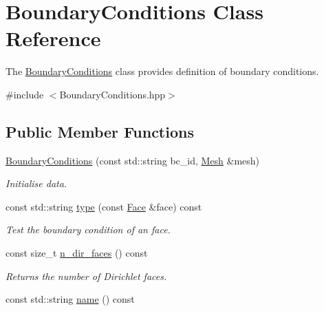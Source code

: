 \hypertarget{classBoundaryConditions}{}\section{Boundary\+Conditions Class Reference}
\label{classBoundaryConditions}


The \hyperlink{classBoundaryConditions}{Boundary\+Conditions} class provides definition of boundary conditions.  




{\ttfamily \#include $<$Boundary\+Conditions.\+hpp$>$}

\subsection*{Public Member Functions}
\begin{DoxyCompactItemize}
\item 
\hyperlink{classBoundaryConditions_a5f9b50ca35f0fcee51e84e015223396c}{Boundary\+Conditions} (const std\+::string bc\+\_\+id, \hyperlink{classHArDCore3D_1_1Mesh}{Mesh} \&mesh)
\begin{DoxyCompactList}\small\item\em Initialise data. \end{DoxyCompactList}\item 
const std\+::string \hyperlink{classBoundaryConditions_a2d4ed623f0f8b4585cbe75454777e14c}{type} (const \hyperlink{classHArDCore3D_1_1Face}{Face} \&face) const
\begin{DoxyCompactList}\small\item\em Test the boundary condition of an face. \end{DoxyCompactList}\item 
\mbox{\label{classBoundaryConditions_af9e9493f0ba9be92b7299838bc08f0bf}} 
const size\+\_\+t \hyperlink{classBoundaryConditions_af9e9493f0ba9be92b7299838bc08f0bf}{n\+\_\+dir\+\_\+faces} () const
\begin{DoxyCompactList}\small\item\em Returns the number of Dirichlet faces. \end{DoxyCompactList}\item 
\mbox{\label{classBoundaryConditions_ac3609733d5e7e43e9240d0a8b05d17ba}} 
const std\+::string \hyperlink{classBoundaryConditions_ac3609733d5e7e43e9240d0a8b05d17ba}{name} () const

\end{DoxyCompactItemize}
